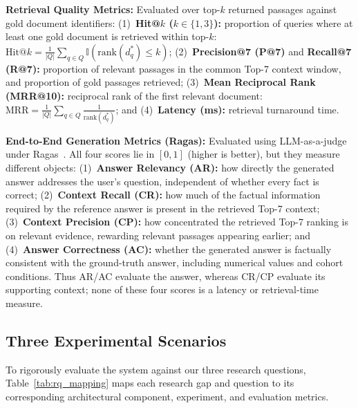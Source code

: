 \textbf{Retrieval Quality Metrics:} Evaluated over top-$k$ returned passages against gold document identifiers: (1)~\textbf{Hit@$k$ ($k \in \{1, 3\}$):} proportion of queries where at least one gold document is retrieved within top-$k$: $\mathrm{Hit}@k = \frac{1}{|Q|} \sum_{q \in Q} \mathbb{I}(\mathrm{rank}(d^*_q) \le k)$; (2)~\textbf{Precision@7 (P@7)} and \textbf{Recall@7 (R@7):} proportion of relevant passages in the common Top-7 context window, and proportion of gold passages retrieved; (3)~\textbf{Mean Reciprocal Rank (MRR@10):} reciprocal rank of the first relevant document: $\mathrm{MRR} = \frac{1}{|Q|} \sum_{q \in Q} \frac{1}{\mathrm{rank}(d^*_q)}$; and (4)~\textbf{Latency (ms):} retrieval turnaround time.

\textbf{End-to-End Generation Metrics (Ragas):} Evaluated using LLM-as-a-judge under Ragas~\cite{es2023ragas}. All four scores lie in $[0,1]$ (higher is better), but they measure different objects: (1)~\textbf{Answer Relevancy (AR):} how directly the generated answer addresses the user's question, independent of whether every fact is correct; (2)~\textbf{Context Recall (CR):} how much of the factual information required by the reference answer is present in the retrieved Top-7 context; (3)~\textbf{Context Precision (CP):} how concentrated the retrieved Top-7 ranking is on relevant evidence, rewarding relevant passages appearing earlier; and (4)~\textbf{Answer Correctness (AC):} whether the generated answer is factually consistent with the ground-truth answer, including numerical values and cohort conditions. Thus AR/AC evaluate the answer, whereas CR/CP evaluate its supporting context; none of these four scores is a latency or retrieval-time measure.

\subsection{Three Experimental Scenarios}
\label{sec:scenarios}

To rigorously evaluate the system against our three research questions, Table~\ref{tab:rq_mapping} maps each research gap and question to its corresponding architectural component, experiment, and evaluation metrics.

